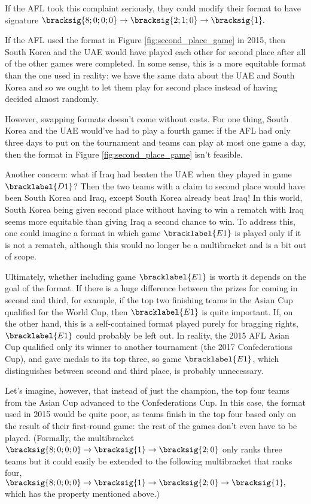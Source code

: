 {    If the AFL took this complaint seriously, they could modify their format to have signature $\bracksig{8;0;0;0} \to \bracksig{2; 1; 0} \to \bracksig{1}.$
    

    If the AFL used the format in Figure \ref{fig:second_place_game} in 2015, then South Korea and the UAE would have played each other for second place after all of the other games were completed. In some sense, this is a more equitable format than the one used in reality: we have the same data about the UAE and South Korea and so we ought to let them play for second place instead of having decided almost randomly.

    However, swapping formats doesn't come without costs. For one thing, South Korea and the UAE would've had to play a fourth game: if the AFL had only three days to put on the tournament and teams can play at most one game a day, then the format in Figure \ref{fig:second_place_game} isn't feasible.

    Another concern: what if Iraq had beaten the UAE when they played in game $\bracklabel{D1}$? Then the two teams with a claim to second place would have been South Korea and Iraq, except South Korea already beat Iraq! In this world, South Korea being given second place without having to win a rematch with Iraq seems more equitable than giving Iraq a second chance to win. To address this, one could imagine a format in which game $\bracklabel{E1}$ is played only if it is not a rematch, although this would no longer be a multibracket and is a bit out of scope.

    Ultimately, whether including game $\bracklabel{E1}$ is worth it depends on the goal of the format. If there is a huge difference between the prizes for coming in second and third, for example, if the top two finishing teams in the Asian Cup qualified for the World Cup, then $\bracklabel{E1}$ is quite important. If, on the other hand, this is  a self-contained format played purely for bragging rights, $\bracklabel{E1}$ could probably be left out. In reality, the 2015 AFL Asian Cup qualified only its winner to another tournament (the 2017 Confederations Cup), and gave medals to its top three, so game $\bracklabel{E1}$, which distinguishes between second and third place, is probably unnecessary.

    Let's imagine, however, that instead of just the champion, the top four teams from the Asian Cup advanced to the Confederations Cup. In this case, the format used in 2015 would be quite poor, as teams finish in the top four based only on the result of their first-round game: the rest of the games don't even have to be played. (Formally, the multibracket $\bracksig{8;0;0;0} \to \bracksig{1} \to \bracksig{2; 0}$ only ranks three teams but it could easily be extended to the following multibracket that ranks four, $\bracksig{8;0;0;0} \to \bracksig{1} \to \bracksig{2; 0} \to \bracksig{1},$ which has the property mentioned above.)
    
}
